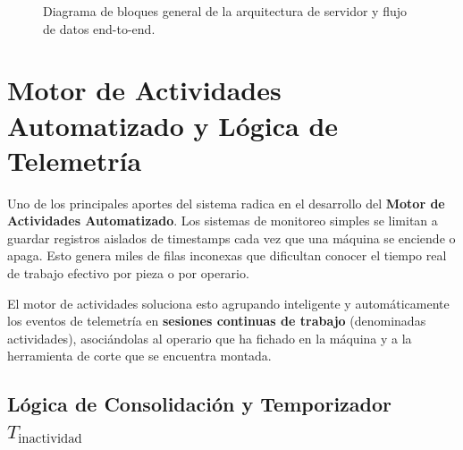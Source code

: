 \documentclass[11pt,a4paper]{article}
\begin{document}
\begin{figure}[htbp]
\shorthandon{<>}
\caption{Diagrama de bloques general de la arquitectura de servidor y flujo de datos end-to-end.}
\label{fig:arquitectura_global}
\end{figure}

\section{Motor de Actividades Automatizado y Lógica de Telemetría}

Uno de los principales aportes del sistema radica en el desarrollo del \textbf{Motor de Actividades Automatizado}. Los sistemas de monitoreo simples se limitan a guardar registros aislados de timestamps cada vez que una máquina se enciende o apaga. Esto genera miles de filas inconexas que dificultan conocer el tiempo real de trabajo efectivo por pieza o por operario.

El motor de actividades soluciona esto agrupando inteligente y automáticamente los eventos de telemetría en \textbf{sesiones continuas de trabajo} (denominadas actividades), asociándolas al operario que ha fichado en la máquina y a la herramienta de corte que se encuentra montada.

\subsection{Lógica de Consolidación y Temporizador $T_{\text{inactividad}}$}
\end{document}
